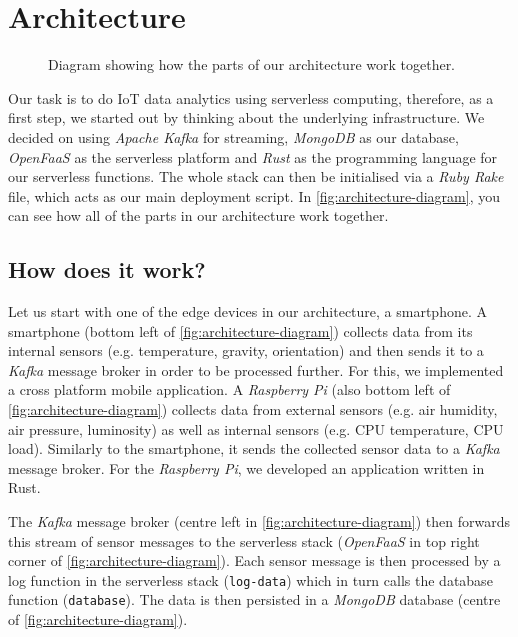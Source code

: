 \chapter{Architecture}
\label{sec:architecture}

\begin{figure}[H]
  \caption{Diagram showing how the parts of our architecture work together.
    \nocite{smartphone-icon, browser-icon}
  }
  \label{fig:architecture-diagram}
\end{figure}

Our task is to do IoT data analytics using serverless computing, therefore, as a first step, we
started out by thinking about the underlying infrastructure. We decided on using \textit{Apache
Kafka} for streaming, \textit{MongoDB} as our database, \textit{OpenFaaS} as the serverless platform
and \textit{Rust} as the programming language for our serverless functions. The whole stack can then
be initialised via a \textit{Ruby Rake} file, which acts as our main deployment script. In
\autoref{fig:architecture-diagram}, you can see how all of the parts in our architecture work
together.

\section{How does it work?}

Let us start with one of the edge devices in our architecture, a smartphone. A smartphone (bottom
left of \autoref{fig:architecture-diagram}) collects data from its internal sensors (e.g.
temperature, gravity, orientation) and then sends it to a \textit{Kafka} message broker in order to
be processed further. For this, we implemented a cross platform mobile application. A
\textit{Raspberry Pi} (also bottom left of \autoref{fig:architecture-diagram}) collects data from
external sensors (e.g. air humidity, air pressure, luminosity) as well as internal sensors (e.g. CPU
temperature, CPU load). Similarly to the smartphone, it sends the collected sensor data to a
\textit{Kafka} message broker. For the \textit{Raspberry Pi}, we developed an application written in
Rust.

The \textit{Kafka} message broker (centre left in \autoref{fig:architecture-diagram}) then forwards
this stream of sensor messages to the serverless stack (\textit{OpenFaaS} in top right corner of
\autoref{fig:architecture-diagram}). Each sensor message is then processed by a log function in the
serverless stack (\texttt{log-data}) which in turn calls the database function (\texttt{database}).
The data is then persisted in a \textit{MongoDB} database (centre of
\autoref{fig:architecture-diagram}).

